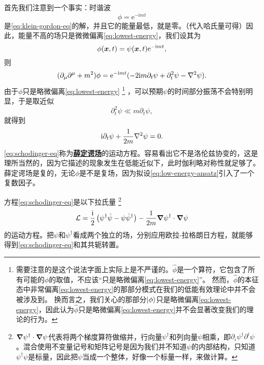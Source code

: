 \documentclass[hyperref, UTF8, a4paper]{ctexart}
\newcommand*{\ii}{\mathrm{i}}
\newcommand*{\ee}{\mathrm{e}}
\newcommand{\concept}[1]{\underline{\textbf{#1}}}
\begin{document}
首先我们注意到一个事实：时谐波
\begin{equation}
    \phi = \ee^{- \ii m t}
    \label{eq:lowest-energy}
\end{equation}
是\eqref{eq:klein-gordon-eq}的解，并且它的能量最低，就是零。（代入哈氏量可得）因此，能量不高的场只是微微偏离\eqref{eq:lowest-energy}，我们设其为
\begin{equation}
    \phi(\vb*{x}, t) = \psi(\vb*{x}, t) \ee^{- \ii m t},
    \label{eq:low-energy-ansatz}
\end{equation}
则
\[
    (\partial_\mu \partial^\mu + m^2) \phi = \ee^{- \ii m t} (-2 \ii m \partial_t \psi + \partial_t^2 \psi - \laplacian{\psi}).
\]
由于$\phi$只是略微偏离\eqref{eq:lowest-energy}%
\footnote{需要注意的是这个说法字面上实际上是不严谨的。$\hat{\phi}$是一个算符，它包含了所有可能的$\phi$的取值，不应该“只是略微偏离\eqref{eq:lowest-energy}”。
然而，$\hat{\phi}$的本征态中非常偏离\eqref{eq:lowest-energy}的那部分模式在我们的低能有效理论中并不会被涉及到。
换而言之，我们关心的那部分$\ket{\phi}$只是略微偏离\eqref{eq:lowest-energy}，因此认为$\hat{\phi}$只是略微偏离\eqref{eq:lowest-energy}并不会显著改变我们的理论的行为。
}%
，可以预期$\psi$的时间部分振荡不会特别明显，于是取近似
\[
    \partial_t^2 \psi \ll m \partial_t \psi,
\]
就得到
\begin{equation}
    \ii \partial_t \psi + \frac{1}{2m} \laplacian{\psi} = 0.
    \label{eq:schodinger-eq}
\end{equation}
\eqref{eq:schodinger-eq}称为\concept{薛定谔场}的运动方程。容易看出它不是洛伦兹协变的，这是理所当然的，因为它描述的现象发生在低能近似下，此时伽利略对称性就足够了。
薛定谔场是复的，无论$\phi$是不是复场，因为拟设\eqref{eq:low-energy-ansatz}引入了一个复数因子。

方程\eqref{eq:schodinger-eq}是以下拉氏量%
\footnote{$\grad{\psi}^\dagger \cdot \grad{\psi}$代表将两个梯度算符做缩并，行向量$\psi^\dagger$和列向量$\psi$相乘，即$\partial_i \psi^\dagger \partial^i \psi$。混合使用不变量记号和矩阵记号是因为我们并不知道$\psi$的内部结构，只知道$\psi^\dagger \psi$是标量，因此把$\psi$当成一个整体，好像一个标量一样，来做计算。}
\begin{equation}
    \mathcal{L} = \frac{\ii}{2} \left( \psi^\dagger \dot{\psi} - \psi \dot{\psi}^\dagger \right) - \frac{1}{2m} \grad{\psi^\dagger} \cdot \grad{\psi}
    \label{eq:schodinger-lagrangian}
\end{equation}
的运动方程。把$\psi$和$\psi^\dagger$看成两个独立的场，分别应用欧拉-拉格朗日方程，就能够得到\eqref{eq:schodinger-eq}和其共轭转置。
\end{document}

